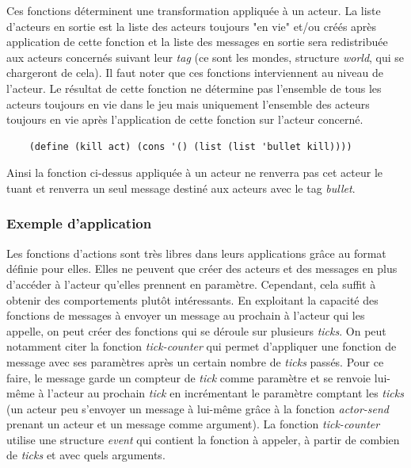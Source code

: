 \documentclass{article}
\begin{document}
Ces fonctions déterminent une transformation appliquée à un acteur. La liste d'acteurs en sortie est la liste des acteurs toujours "en vie" et/ou créés après application de cette fonction et la liste des messages en sortie sera redistribuée aux acteurs concernés suivant leur \textit{tag} (ce sont les mondes, structure \textit{world}, qui se chargeront de cela).
Il faut noter que ces fonctions interviennent au niveau de l'acteur. Le résultat de cette fonction ne détermine pas l'ensemble de tous les acteurs toujours en vie dans le jeu mais uniquement l'ensemble des acteurs toujours en vie après l'application de cette fonction sur l'acteur concerné.

\begin{center}
    \begin{verbatim}
    (define (kill act) (cons '() (list (list 'bullet kill))))
    \end{verbatim}
\end{center}
    
Ainsi la fonction ci-dessus appliquée à un acteur ne renverra pas cet acteur le tuant et renverra un seul message destiné aux acteurs avec le tag \textit{bullet}.
    
\subsubsection{Exemple d'application}

Les fonctions d'actions sont très libres dans leurs applications grâce au format définie pour elles. Elles ne peuvent que créer des acteurs et des messages en plus d'accéder à l'acteur qu'elles prennent en paramètre. Cependant, cela suffit à obtenir des comportements plutôt intéressants. En exploitant la capacité des fonctions de messages à envoyer un message au prochain  à l'acteur qui les appelle, on peut créer des fonctions qui se déroule sur plusieurs \textit{ticks}. On peut notamment citer la fonction \textit{tick-counter} qui permet d'appliquer une fonction de message avec ses paramètres après un certain nombre de \textit{ticks} passés. Pour ce faire, le message garde un compteur de \textit{tick} comme paramètre et se renvoie lui-même à l'acteur au prochain \textit{tick} en incrémentant le paramètre comptant les \textit{ticks} (un acteur peu s'envoyer un message à lui-même grâce à la fonction \textit{actor-send} prenant un acteur et un message comme argument). La fonction \textit{tick-counter} utilise une structure \textit{event} qui contient la fonction à appeler, à partir de combien de \textit{ticks} et avec quels arguments.
\end{document}
